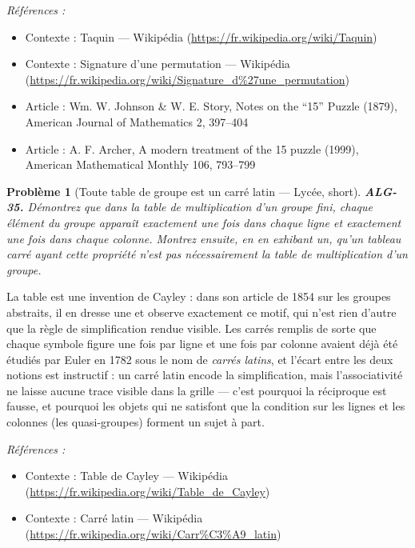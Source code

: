 \documentclass[11pt]{article}
\newtheorem{problem}{Problème}
\newenvironment{refs}{\par\small\noindent\emph{Références :}\begin{itemize}\setlength\itemsep{0pt}}{\end{itemize}\normalsize}
\begin{document}
\begin{refs}
\item Contexte : Taquin --- Wikipédia (\url{https://fr.wikipedia.org/wiki/Taquin})
\item Contexte : Signature d'une permutation --- Wikipédia (\url{https://fr.wikipedia.org/wiki/Signature_d%27une_permutation})
\item Article : Wm. W. Johnson \& W. E. Story, \og{} Notes on the ``15'' Puzzle \fg{} (1879), American Journal of Mathematics 2, 397--404
\item Article : A. F. Archer, \og{} A modern treatment of the 15 puzzle \fg{} (1999), American Mathematical Monthly 106, 793--799
\end{refs}

\bigskip

\begin{problem}[{Toute table de groupe est un carré latin --- Lycée, short}]
\textbf{ALG-35.} Démontrez que dans la table de multiplication d'un groupe fini,
chaque élément du groupe apparaît exactement une fois dans chaque ligne et exactement une fois dans chaque
colonne. Montrez ensuite, en en exhibant un, qu'un tableau carré ayant cette propriété n'est pas
nécessairement la table de multiplication d'un groupe.
\end{problem}

\noindent La table est une invention de Cayley : dans son article de 1854 sur les groupes abstraits,
il en dresse une et observe exactement ce motif, qui n'est rien d'autre que la règle de simplification rendue
visible. Les carrés remplis de sorte que chaque symbole figure une fois par ligne et une fois par colonne
avaient déjà été étudiés par Euler en 1782 sous le nom de \textit{carrés latins}, et l'écart entre les deux
notions est instructif : un carré latin encode la simplification, mais l'associativité ne laisse aucune trace
visible dans la grille --- c'est pourquoi la réciproque est fausse, et pourquoi les objets qui ne satisfont que
la condition sur les lignes et les colonnes (les quasi-groupes) forment un sujet à part.

\begin{refs}
\item Contexte : Table de Cayley --- Wikipédia (\url{https://fr.wikipedia.org/wiki/Table_de_Cayley})
\item Contexte : Carré latin --- Wikipédia (\url{https://fr.wikipedia.org/wiki/Carr%C3%A9_latin})
\end{refs}

\bigskip
\end{document}
